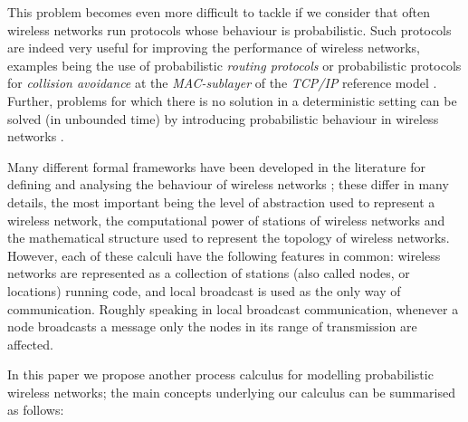 \documentclass{LMCS}
\begin{document}
This problem becomes even more difficult to tackle if we consider that 
often wireless networks run protocols whose behaviour is probabilistic. 
Such protocols are indeed very useful for improving the performance of 
wireless networks, examples being the use of probabilistic \emph{routing 
protocols} \cite{sample} or probabilistic protocols for \emph{collision avoidance} 
at the \emph{MAC-sublayer} of the \emph{TCP/IP} reference model \cite{macsurvey}. 
Further, problems for which there is no solution in   
a deterministic setting can be solved (in unbounded time) by introducing 
probabilistic behaviour in wireless networks \cite{BraTou85}.
 
Many different formal frameworks have been developed in the literature 
for defining and \linebreak 
analysing the behaviour of wireless networks 
\cite{nanz,Godskesen07,GwFM10,LaneseS10,omegacalc,merro,gallina2011,songphd,wang}; 
these differ in many details, 
the most important being the level of abstraction used to 
represent a wireless network, the computational power of stations 
of wireless networks and the mathematical structure 
used to represent the topology of wireless networks. 
However, each of these calculi have the following features in common: 
wireless networks are represented as a collection of stations (also called 
nodes, or locations) running code, and local broadcast is used as 
the only way of communication. Roughly speaking in local broadcast 
communication, whenever a node broadcasts 
a message only the nodes in its range of transmission are affected.

In this paper we propose another process calculus for modelling probabilistic 
wireless networks; the main concepts underlying our calculus can be 
summarised as follows:
\end{document}
